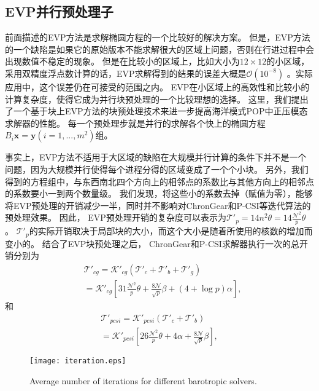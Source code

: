 
\subsection{EVP并行预处理子}
 
前面描述的EVP方法是求解椭圆方程的一个比较好的解决方案。 
但是，EVP方法的一个缺陷是如果它的原始版本不能求解很大的区域上问题，否则在行进过程中会出现数值不稳定的现象\cite{roache1995elliptic}。
但是在比较小的区域上，比如大小为$12\times 12$的小区域，采用双精度浮点数计算的话，EVP求解得到的结果的误差大概是$\mathcal{O}(10^{-8})$ 。实际应用中，这个误差仍在可接受的范围之内。 
EVP在小区域上的高效性和比较小的计算复杂度，使得它成为并行块预处理的一个比较理想的选择。 
这里，我们提出了一个基于块上EVP方法的块预处理技术来进一步提高海洋模式POP中正压模态求解器的性能。
每一个预处理步就是并行的求解各个快上的椭圆方程 $B_i \textbf{x} = \textbf{y} (i=1,...,m^2)$组。 


 
事实上，EVP方法不适用于大区域的缺陷在大规模并行计算的条件下并不是一个问题，因为大规模并行使得每个进程分得的区域变成了一个个小块。
另外，我们得到的方程组中，与东西南北四个方向上的相邻点的系数比与其他方向上的相邻点的系数要小一到两个数量级。 
我们发现，将这些小的系数去掉（赋值为零），能够将EVP预处理的开销减少一半，同时并不影响对ChronGear和P-CSI等迭代算法的预处理效果。 
因此， EVP预处理开销的复杂度可以表示为$\mathcal{T'}_{p} = 14n^2\theta=
14\frac{\mathcal{N}^2}{p}\theta$。 
$\mathcal{T'}_{p}$的实际开销取决于局部块的大小，而这个大小是随着所使用的核数的增加而变小的。
结合了EVP块预处理之后， ChronGear和P-CSI求解器执行一次的总开销分别为 
\begin{eqnarray}
\label{t_evppcg}
&\mathcal{T'}_{cg}=\mathcal{K'}_{cg} (\mathcal{T'}_c + \mathcal{T'}_b+\mathcal{T'}_g )\nonumber \\
&=\mathcal{K'}_{cg} [31 \frac{\mathcal{N}^2}{p}\theta + \frac{8\mathcal{N}}{\sqrt{p}}\beta +(4+\log p)\alpha],
\end{eqnarray}
和
\begin{eqnarray}
\label{t_evppsi}
\mathcal{T'}_{pcsi} = \mathcal{K'}_{pcsi}(\mathcal{T'}_c + \mathcal{T'}_b ) \nonumber \\
= \mathcal{K'}_{pcsi}[26\frac{\mathcal{N}^2}{p}\theta+ 4\alpha + \frac{8\mathcal{N}}{ \sqrt{p}}\beta],
\end{eqnarray}
 
\begin {figure}[!t]
\centering
\texttt{[image: iteration.eps]}
\vspace{-.1in}
\caption[] {Average number of iterations for different barotropic solvers. \label{fig:iteration}}
\vspace{-.1in}
\end{figure}


